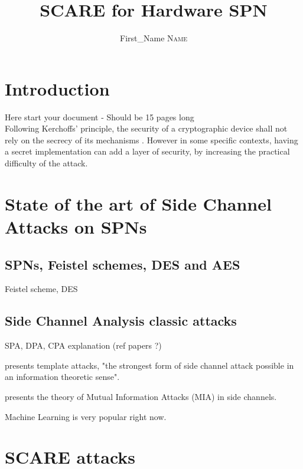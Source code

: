 \documentclass[11pt]{sdm}
\title{SCARE for Hardware SPN}
\author{First\_Name \textsc{Name}}
\begin{document}
\maketitle


\section*{Introduction}

Here start your document - Should be 15 pages long \\

Following Kerchoffs' principle, the security of a cryptographic device shall not rely on the secrecy of its mechanisms \cite{Kerckhoffs_1883}.
However in some specific contexts, having a secret implementation can add a layer of security, by increasing the practical difficulty of the attack.

\section{State of the art of Side Channel Attacks on SPNs}

\subsection{SPNs, Feistel schemes, DES and AES}

Feistel scheme, DES

\cite{Standards2001}

\subsection{Side Channel Analysis classic attacks}

SPA, DPA, CPA explanation (ref papers ?)

\cite{Chari_Rao_Rohatgi_2003} presents template attacks, "the strongest form of side channel attack possible in an information theoretic sense".

\cite{Prouff_Rivain_1970} presents the theory of Mutual Information Attacks (MIA) in side channels.

Machine Learning is very popular right now.

\section{SCARE attacks}
\end{document}
